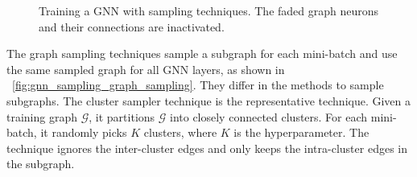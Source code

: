 \begin{figure}
	\centering
	\caption{Training a GNN with sampling techniques. The faded graph neurons and their connections are inactivated.}
	\label{fig:gnn_sampling}
\end{figure}

The graph sampling techniques \cite{zeng2018_aesg, chiang2019_cluster_gcn, zeng2020_graphsaint} sample a subgraph for each mini-batch and use the same sampled graph for all GNN layers, as shown in \figurename~\ref{fig:gnn_sampling_graph_sampling}.
They differ in the methods to sample subgraphs.
The cluster sampler technique \cite{chiang2019_cluster_gcn} is the representative technique.
Given a training graph $\mathcal{G}$, it partitions $\mathcal{G}$ into closely connected clusters.
For each mini-batch, it randomly picks $K$ clusters, where $K$ is the hyperparameter.
The technique ignores the inter-cluster edges and only keeps the intra-cluster edges in the subgraph.

